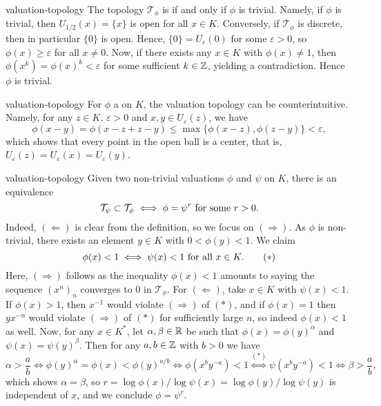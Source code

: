 \begin{example}{valuation-topology}
    The topology $\mathcal{T}_\phi$ is  if and only if $\phi$ is trivial. Namely, if $\phi$ is trivial, then $U_{1/2}(x) = \{ x \}$ is open for all $x \in K$. Conversely, if $\mathcal{T}_\phi$ is discrete, then in particular $\{ 0 \}$ is open. Hence, $\{ 0 \} = U_\varepsilon(0)$ for some $\varepsilon > 0$, so $\phi(x) \ge \varepsilon$ for all $x \ne 0$. Now, if there exists any $x \in K$ with $\phi(x) \ne 1$, then $\phi(x^k) = \phi(x)^k < \varepsilon$ for some sufficient $k \in \mathbb{Z}$, yielding a contradiction. Hence $\phi$ is trivial.
\end{example}

\begin{example}{valuation-topology}
    For $\phi$ a  on $K$, the valuation topology can be counterintuitive. Namely, for any $z \in K$, $\varepsilon > 0$ and $x, y \in U_\varepsilon(z)$, we have
    \[ \phi(x - y) = \phi(x - z + z - y) \le \max \{ \phi(x - z), \phi(z - y) \} < \varepsilon , \]
    which shows that every point in the open ball is a center, that is, $U_\varepsilon(z) = U_\varepsilon(x) = U_\varepsilon(y)$.
\end{example}

\begin{example}{valuation-topology}
    Given two non-trivial valuations $\phi$ and $\psi$ on $K$, there is an equivalence
    \[ \mathcal{T}_\psi \subset \mathcal{T}_\phi \iff  \phi = \psi^r \textup{ for some } r > 0 . \]
    Indeed, $(\Leftarrow)$ is clear from the definition, so we focus on $(\Rightarrow)$.
    As $\phi$ is non-trivial, there exists an element $y \in K$ with $0 < \phi(y) < 1$. We claim
    \[ \phi(x) < 1 \iff \psi(x) < 1 \textup{ for all } x \in K . \tag{$*$} \]
    Here, $(\Rightarrow)$ follows as the inequality $\phi(x) < 1$ amounts to saying the sequence $(x^n)_n$ converges to $0$ in $\mathcal{T}_\phi$. For $(\Leftarrow)$, take $x \in K$ with $\psi(x) < 1$. If $\phi(x) > 1$, then $x^{-1}$ would violate $(\Rightarrow)$ of $(*)$, and if $\phi(x) = 1$ then $yx^{-n}$ would violate $(\Rightarrow)$ of $(*)$ for sufficiently large $n$, so indeed $\phi(x) < 1$ as well.
    Now, for any $x \in K^*$, let $\alpha, \beta \in \mathbb{R}$ be such that $\phi(x) = \phi(y)^\alpha$ and $\psi(x) = \psi(y)^\beta$. Then for any $a, b \in \mathbb{Z}$ with $b > 0$ we have
    \[ \alpha > \frac{a}{b} \iff \phi(y)^\alpha = \phi(x) < \phi(y)^{a/b} \iff \phi(x^b y^{-a}) < 1 \overset{(*)}{\iff} \psi(x^b y^{-a}) < 1 \iff \beta > \frac{a}{b} , \]
    which shows $\alpha = \beta$, so $r = \log \phi(x) / \log \psi(x) = \log \phi(y) / \log \psi(y)$ is independent of $x$, and we conclude $\phi = \psi^r$.
\end{example}

